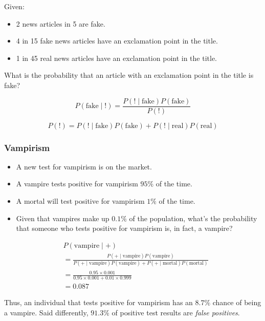 \documentclass{beamer}
\begin{document}
\begin{frame}

    Given:
    \setlength\parskip{1em}
    \begin{itemize}
        \setlength\itemsep{1em}
        \item 2 news articles in 5 are fake.
        \item 4 in 15 fake news articles have an exclamation point in the title.
        \item 1 in 45 real news articles have an exclamation point in the title.
    \end{itemize}
    What is the probability that an article with an exclamation point
    in the title is fake?
    
\end{frame}

\begin{frame}
    \[
    P(\text{fake}\mid\text{!}) =
    \frac{P(\text{!}\mid \text{fake})P(\text{fake})}{P(\text{!})}
    \]

    \[
    P(\text{!}) = P(\text{!}\mid \text{fake})P(\text{fake}) +
    P(\text{!}\mid \text{real})P(\text{real})
    \]
\end{frame}

\begin{frame}
    \frametitle{Vampirism}
    \begin{itemize}
        \setlength\itemsep{1em}
    
        \item A new test for vampirism is on the market.
        \item A vampire tests positive for vampirism $95\%$ of the time.
        \item A mortal will test positive for vampirism $1\%$ of the time.
        \item Given that vampires make up $0.1\%$ of the population, what's the probability that someone who tests positive for vampirism is, in fact, a vampire?
    \end{itemize}
\end{frame}


\begin{frame}    
    \begin{align*}
    &P(\text{vampire}\mid+)\\
    &=\frac{P(+\mid\text{vampire})P(\text{vampire})}
    {P(+\mid\text{vampire})P(\text{vampire}) + P(+\mid\text{mortal})P(\text{mortal})}\\
    &= \frac{0.95\times 0.001}{0.95\times 0.001 + 0.01\times 0.999}\\
    &= 0.087
    \end{align*}

    Thus, an individual that tests positive for vampirism has an $8.7\%$ chance of being a vampire.
    Said differently, $91.3\%$ of positive test results are \emph{false positives}.
\end{frame}
\end{document}
